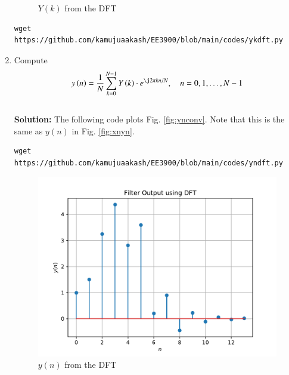 \documentclass[journal,12pt,twocolumn]{IEEEtran}
\newcommand{\solution}{\noindent \textbf{Solution: }}
\providecommand{\brak}[1]{\ensuremath{\left(#1\right)}}
\numberwithin{equation}{section}
\renewcommand\thesection{\arabic{section}}
\begin{document}
\begin{enumerate}[label=\thesection.\arabic*]
\begin{figure}[!ht]
\caption{$Y(k)$ from the DFT}
\label{fig:yk}
\end{figure}
\begin{lstlisting}
wget https://github.com/kamujuaakash/EE3900/blob/main/codes/ykdft.py
\end{lstlisting}
\item Compute
\begin{equation}
 y\brak{n}={\frac {1}{N}}\sum _{k=0}^{N-1}Y\brak{k}\cdot e^{\j 2\pi kn/N},\quad n = 0,1,\dots, N-1
\end{equation}
\\
\solution The following code plots Fig. \ref{fig:ynconv}. Note that this is the same as 
$y(n)$ in  Fig. 
\ref{fig:xnyn}. 
%
\begin{lstlisting}
wget https://github.com/kamujuaakash/EE3900/blob/main/codes/yndft.py
\end{lstlisting}
\begin{figure}[!ht]
\centering
\includegraphics[width=\columnwidth]{./figs/yndft}
\caption{$y(n)$ from the DFT}
\label{fig:yndft}
\end{figure}


\end{enumerate}
\end{document}
